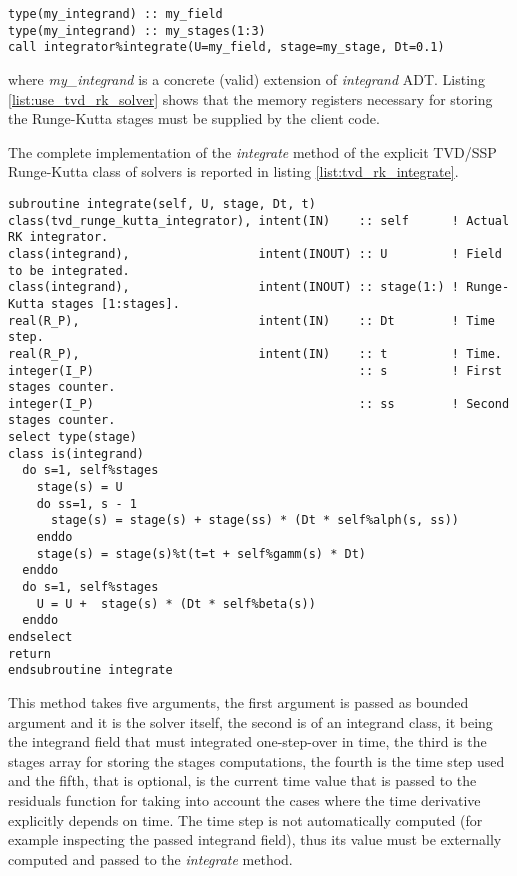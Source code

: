 \documentclass[pdftex,preprint,3p,times,numbers]{elsarticle}
\begin{document}
\begin{lstlisting}[firstnumber=1,style=code,caption={example of usage of a TVD/SSP Runge-Kutta integrator},label={list:use_tvd_rk_solver}]
type(my_integrand) :: my_field
type(my_integrand) :: my_stages(1:3)
call integrator%integrate(U=my_field, stage=my_stage, Dt=0.1)
\end{lstlisting}
where \emph{my\_integrand} is a concrete (valid) extension of \emph{integrand} ADT. Listing \ref{list:use_tvd_rk_solver} shows that the memory registers necessary for storing the Runge-Kutta stages must be supplied by the client code.

The complete implementation of the \emph{integrate} method of the explicit TVD/SSP Runge-Kutta class of solvers is reported in listing \ref{list:tvd_rk_integrate}.

\begin{lstlisting}[firstnumber=1,style=code,caption={implementation of the \emph{integrate} method of explicit TVD/SSP Runge-Kutta class},label={list:tvd_rk_integrate}]
subroutine integrate(self, U, stage, Dt, t)
class(tvd_runge_kutta_integrator), intent(IN)    :: self      ! Actual RK integrator.
class(integrand),                  intent(INOUT) :: U         ! Field to be integrated.
class(integrand),                  intent(INOUT) :: stage(1:) ! Runge-Kutta stages [1:stages].
real(R_P),                         intent(IN)    :: Dt        ! Time step.
real(R_P),                         intent(IN)    :: t         ! Time.
integer(I_P)                                     :: s         ! First stages counter.
integer(I_P)                                     :: ss        ! Second stages counter.
select type(stage)
class is(integrand)
  do s=1, self%stages
    stage(s) = U
    do ss=1, s - 1
      stage(s) = stage(s) + stage(ss) * (Dt * self%alph(s, ss))
    enddo
    stage(s) = stage(s)%t(t=t + self%gamm(s) * Dt)
  enddo
  do s=1, self%stages
    U = U +  stage(s) * (Dt * self%beta(s))
  enddo
endselect
return
endsubroutine integrate
\end{lstlisting}

This method takes five arguments, the first argument is passed as bounded argument and it is the solver itself, the second is of an integrand class, it being the integrand field that must integrated one-step-over in time, the third is the stages array for storing the stages computations, the fourth is the time step used and the fifth, that is optional, is the current time value that is passed to the residuals function for taking into account the cases where the time derivative explicitly depends on time. The time step is not automatically computed (for example inspecting the passed integrand field), thus its value must be externally computed and passed to the \emph{integrate} method.
\end{document}

